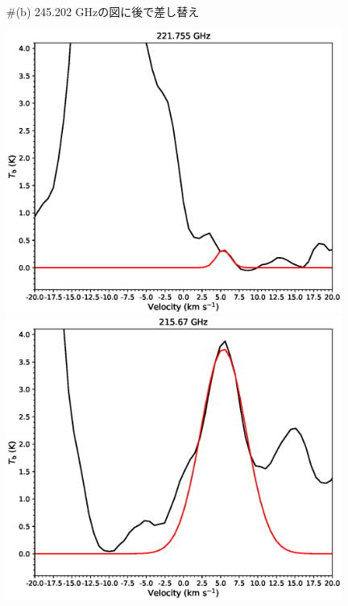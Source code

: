 \begin{figure}[htbp]
\begin{center}
\begin{minipage}{0.98\textwidth}
\begin{center}
\begin{minipage}{0.48\textwidth}
\begin{center}
\\ \#(b) 245.202 GHzの図に後で差し替え
\end{center}
\end{minipage}
\end{center}
\end{minipage}

\begin{minipage}{0.98\textwidth} 
\begin{center}
\begin{minipage}{0.48\textwidth}
\begin{center}
\includegraphics[width=0.98\textwidth]{OrionKL/spectrum/HC/221.755055w_fit.eps}
\end{center}
\end{minipage}
\begin{minipage}{0.48\textwidth}
\begin{center}
\includegraphics[width=0.98\textwidth]{OrionKL/spectrum/HC/215.6696452w_fit.eps}

\end{center}
\end{minipage}
\end{center}
\end{minipage}
\end{center}
\end{figure}
